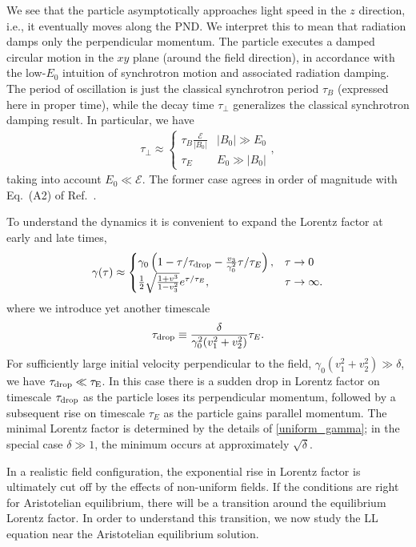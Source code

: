 \documentclass[amsmath,amssymb,nofootinbib,notitlepage,superscriptaddress,twocolumn]{revtex4-2}
\begin{document}
We see that the particle asymptotically approaches light speed in the $z$ direction, i.e., it eventually moves along the PND.  We interpret this to mean that radiation damps only the perpendicular momentum.  The particle executes a damped circular motion in the $xy$ plane (around the field direction), in accordance with the low-$E_0$ intuition of synchrotron motion and associated radiation damping.  The period of oscillation is just the classical synchrotron period $\tau_B$ (expressed here in proper time), while the decay time $\tau_\perp$ generalizes the classical synchrotron damping result.  In particular, we have
\begin{align}
\tau_\perp \approx \begin{cases} \tau_B \frac{\mathcal{E}}{|B_0|} & |B_0| \gg E_0 \\
\tau_E &  E_0 \gg |B_0|
\end{cases},
\end{align}
taking into account $E_0 \ll \mathcal{E}$.  
The former case agrees in order of magnitude with Eq.~(A2) of Ref.~\cite{1984RvMP...56..255B}.


To understand the dynamics it is convenient to expand the Lorentz factor at early and late times,
\begin{align}
    \gamma(\tau) \approx 
    \begin{cases}
    \gamma_0 \left( 1 - \tau/\tau_{\rm drop} - \frac{v_3}{\gamma_0^2} \tau/\tau_E \right), & \tau \to 0 \\
    \frac{1}{2} \sqrt{\frac{1+v^3}{1-v_3^2}} e^{\tau/\tau_E}, & \tau \to \infty.
    \end{cases}\label{gammaearlylate}
\end{align}
where we introduce yet another timescale
\begin{align}\label{taudrop}
    \tau_{\rm drop} \equiv \frac{\delta}{\gamma_0^2(v_1^2+v_2^2)}\tau_E.
\end{align}  
For sufficiently large initial velocity perpendicular to the field, $\gamma_0(v_1^2+v_2^2) \gg \delta$, we have $\tau_{\rm drop} \ll \tau_{\rm E}$.  In this case there is a sudden drop in Lorentz factor on timescale $\tau_{\rm drop}$ as the particle loses its perpendicular momentum, followed by a subsequent rise on timescale $\tau_E$ as the particle gains parallel momentum.  The minimal Lorentz factor is determined by the details of \eqref{uniform_gamma}; in the special case $\delta \gg 1$, the minimum occurs at approximately $\sqrt{\delta}$.

In a realistic field configuration, the exponential rise in Lorentz factor is ultimately cut off by the effects of non-uniform fields.  If the conditions are right for Aristotelian equilibrium, there will be a transition around the equilibrium Lorentz factor.  In order to understand this transition, we now study the LL equation near the Aristotelian equilibrium solution.
\end{document}
